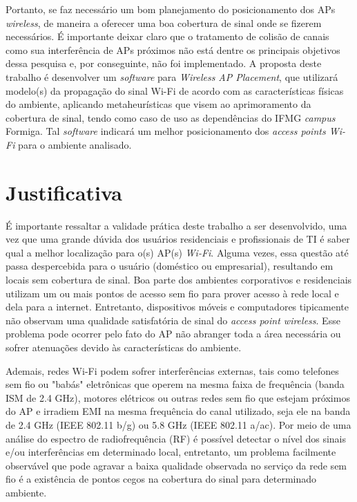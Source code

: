 \documentclass[
	12pt,				%
	openright,			%
	twoside,			%
	a4paper,			%
	english,			%
	french,				%
	spanish,			%
	brazil				%
	]{abntex2}
\begin{document}
Portanto, se faz necessário um bom planejamento do posicionamento dos APs \textit{wireless}, de maneira a oferecer uma boa cobertura de sinal onde se fizerem necessários. É importante deixar claro que o tratamento de colisão de canais como sua interferência de APs próximos não está dentre os principais objetivos dessa pesquisa e, por conseguinte, não foi implementado. A proposta deste trabalho é desenvolver um \textit{software} para \textit{Wireless AP Placement},  que utilizará modelo(s) da propagação do sinal Wi-Fi de acordo com as características físicas do ambiente, aplicando metaheurísticas que visem ao aprimoramento da cobertura de sinal, tendo como caso de uso as dependências do IFMG \textit{campus} Formiga. Tal \textit{software} indicará um melhor posicionamento dos \textit{access points Wi-Fi} para o ambiente analisado.



\section{Justificativa}

É importante ressaltar a validade prática deste trabalho a ser desenvolvido, uma vez que uma grande dúvida dos usuários residenciais e profissionais de TI é saber qual a melhor localização para o(s) AP(s) \textit{Wi-Fi}. Alguma vezes, essa questão até passa despercebida para o usuário (doméstico ou empresarial), resultando em locais sem cobertura de sinal. Boa parte dos ambientes corporativos e residenciais utilizam um ou mais pontos de acesso sem fio para prover acesso à rede local e dela para a internet. Entretanto, dispositivos móveis e computadores tipicamente não observam uma qualidade satisfatória de sinal do \textit{access point wireless}. Esse problema pode ocorrer pelo fato do AP não abranger toda a área necessária ou sofrer atenuações devido às características do ambiente.

Ademais, redes Wi-Fi podem sofrer interferências externas, tais como telefones sem fio ou "babás" eletrônicas que operem na mesma faixa de frequência (banda ISM de 2.4 GHz), motores elétricos ou outras redes sem fio que estejam próximos do AP e irradiem EMI na mesma frequência do canal utilizado, seja ele na banda de 2.4 GHz (IEEE 802.11 b/g) ou 5.8 GHz (IEEE 802.11 a/ac). Por meio de uma análise do espectro de radiofrequência (RF) é possível detectar o nível dos sinais e/ou interferências em determinado local, entretanto, um problema facilmente observável que pode agravar a baixa qualidade observada no serviço da rede sem fio é a existência de pontos cegos na cobertura do sinal para determinado ambiente. 
\end{document}
